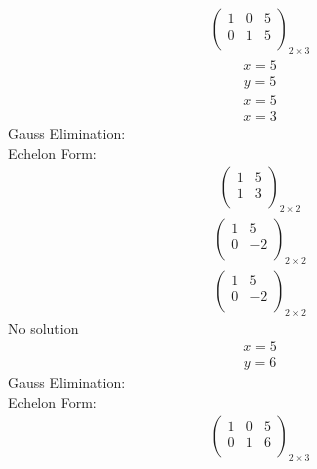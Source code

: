 \documentclass{article}
\begin{document}
\begin{align*}
\left(
\begin{array}{cc|c}
1 & 0 & 5\\
0 & 1 & 5\\
\end{array}
\right)_{2\times 3}
\end{align*}
\begin{align*}
x=5\end{align*}
\begin{align*}
y=5\end{align*}
\begin{align*}
x=5\end{align*}
\begin{align*}
x=3\end{align*}
Gauss Elimination:\\
Echelon Form:\\
\begin{align*}
\left(
\begin{array}{c|c}
1 & 5\\
1 & 3\\
\end{array}
\right)_{2\times 2}
\end{align*}
\begin{align*}
\left(
\begin{array}{c|c}
1 & 5\\
0 & -2\\
\end{array}
\right)_{2\times 2}
\end{align*}
\begin{align*}
\left(
\begin{array}{c|c}
1 & 5\\
0 & -2\\
\end{array}
\right)_{2\times 2}
\end{align*}
No solution\\
\begin{align*}
x=5\end{align*}
\begin{align*}
y=6\end{align*}
Gauss Elimination:\\
Echelon Form:\\
\begin{align*}
\left(
\begin{array}{cc|c}
1 & 0 & 5\\
0 & 1 & 6\\
\end{array}
\right)_{2\times 3}
\end{align*}
\end{document}
